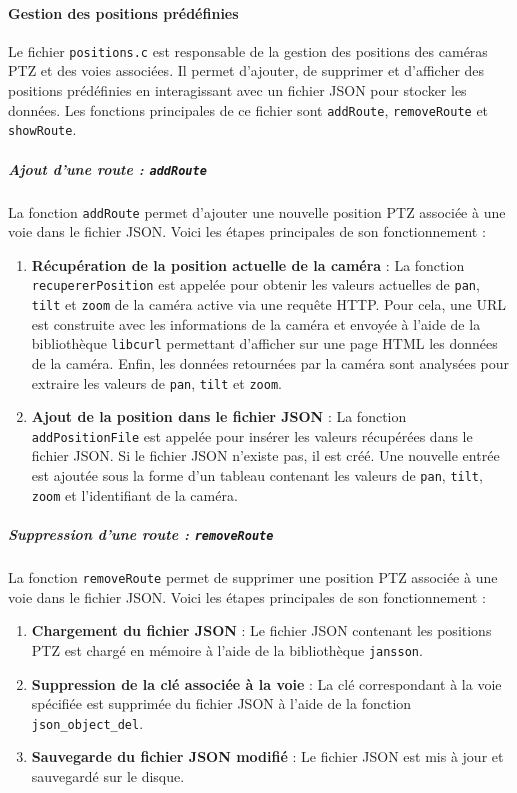 \documentclass[a4paper, 11pt, french]{article}
\newcounter{obj}
\begin{document}
\paragraph{Gestion des positions prédéfinies} 
Le fichier \texttt{positions.c} est responsable de la gestion des positions des caméras PTZ et des voies associées. Il permet d'ajouter, de supprimer et d'afficher des positions prédéfinies en interagissant avec un fichier JSON pour stocker les données. Les fonctions principales de ce fichier sont \texttt{addRoute}, \texttt{removeRoute} et \texttt{showRoute}.

\subparagraph{Ajout d'une route : \texttt{addRoute}}

La fonction \texttt{addRoute} permet d'ajouter une nouvelle position PTZ associée à une voie dans le fichier JSON. Voici les étapes principales de son fonctionnement :
\begin{enumerate}
    \item \textbf{Récupération de la position actuelle de la caméra} :
    La fonction \texttt{recupererPosition} est appelée pour obtenir les valeurs actuelles de \texttt{pan}, \texttt{tilt} et \texttt{zoom} de la caméra active via une requête HTTP. Pour cela, une URL est construite avec les informations de la caméra et envoyée à l'aide de la bibliothèque \texttt{libcurl} permettant d'afficher sur une page HTML les données de la caméra. Enfin, les données retournées par la caméra sont analysées pour extraire les valeurs de \texttt{pan}, \texttt{tilt} et \texttt{zoom}.
    \item \textbf{Ajout de la position dans le fichier JSON} :
    La fonction \texttt{addPositionFile} est appelée pour insérer les valeurs récupérées dans le fichier JSON. Si le fichier JSON n'existe pas, il est créé. Une nouvelle entrée est ajoutée sous la forme d'un tableau contenant les valeurs de \texttt{pan}, \texttt{tilt}, \texttt{zoom} et l'identifiant de la caméra.
\end{enumerate}


\subparagraph{Suppression d'une route : \texttt{removeRoute}}

La fonction \texttt{removeRoute} permet de supprimer une position PTZ associée à une voie dans le fichier JSON. Voici les étapes principales de son fonctionnement :
\begin{enumerate}
    \item \textbf{Chargement du fichier JSON} :
        Le fichier JSON contenant les positions PTZ est chargé en mémoire à l'aide de la bibliothèque \texttt{jansson}.

    \item \textbf{Suppression de la clé associée à la voie} :
        La clé correspondant à la voie spécifiée est supprimée du fichier JSON à l'aide de la fonction \texttt{json\_object\_del}.
    
    \item \textbf{Sauvegarde du fichier JSON modifié} :
        Le fichier JSON est mis à jour et sauvegardé sur le disque. 
    
\end{enumerate}
\end{document}

